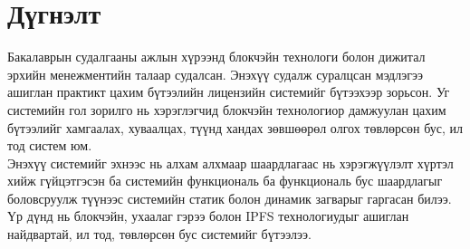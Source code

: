 \chapter{Дүгнэлт}
\indent Бакалаврын судалгааны ажлын хүрээнд блокчэйн технологи болон дижитал эрхийн менежментийн талаар судалсан. Энэхүү судалж суралцсан мэдлэгээ ашиглан практикт цахим бүтээлийн лицензийн системийг бүтээхээр зорьсон. Уг системийн гол зорилго нь хэрэглэгчид блокчэйн технологиор дамжуулан цахим бүтээлийг хамгаалах, хуваалцах, түүнд хандах зөвшөөрөл олгох төвлөрсөн бус, ил тод систем юм.
\\ \indent Энэхүү системийг эхнээс нь алхам алхмаар шаардлагаас нь хэрэгжүүлэлт хүртэл хийж гүйцэтгэсэн ба системийн функциональ ба функциональ бус шаардлагыг боловсруулж түүнээс системийн статик болон динамик загварыг гаргасан билээ. Үр дүнд нь блокчэйн, ухаалаг гэрээ болон IPFS технологиудыг ашиглан найдвартай, ил тод, төвлөрсөн бус системийг бүтээлээ.